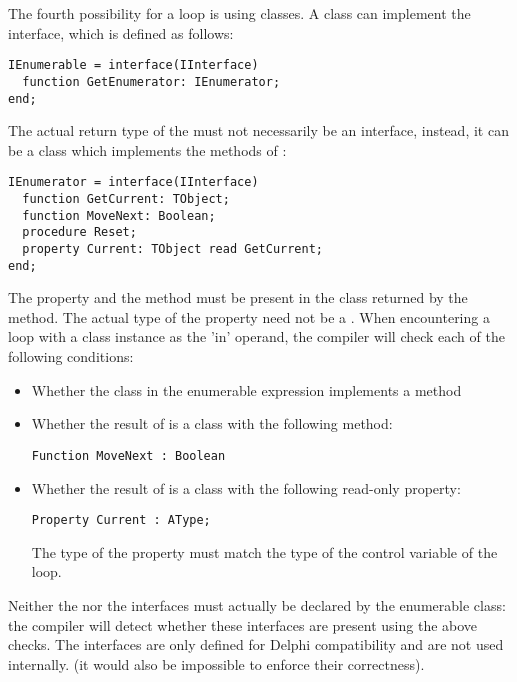 The fourth possibility for a  loop is using classes. A class can implement the
 interface, which is defined as
follows:
\begin{verbatim}
IEnumerable = interface(IInterface)
  function GetEnumerator: IEnumerator;
end;
\end{verbatim}
The actual return type of the  must not necessarily be an
 interface, instead, it can be a class which implements the methods
of :
\begin{verbatim}
IEnumerator = interface(IInterface)
  function GetCurrent: TObject;
  function MoveNext: Boolean;
  procedure Reset;
  property Current: TObject read GetCurrent;
end;
\end{verbatim}
The  property and the  method must be present in
the class returned by the  method. The actual type of the
 property need not be a . When encountering a
 loop with a class instance as the 'in' operand, the compiler will 
check each of the following conditions:
\begin{itemize}
\item Whether the class in the enumerable expression implements a method
\item Whether the result of  is a class with the
following method:
\begin{verbatim}
Function MoveNext : Boolean
\end{verbatim}
\item  Whether the result of  is a class with the
following read-only property:
\begin{verbatim}
Property Current : AType;
\end{verbatim}
The type of the property must match the type of the control variable of the
 loop.
\end{itemize}
Neither the  nor the  interfaces must
actually be declared by the enumerable class: the compiler will detect
whether these interfaces are present using the above checks. The interfaces
are only defined for Delphi compatibility and are not used internally.
(it would also be impossible to enforce their correctness).

